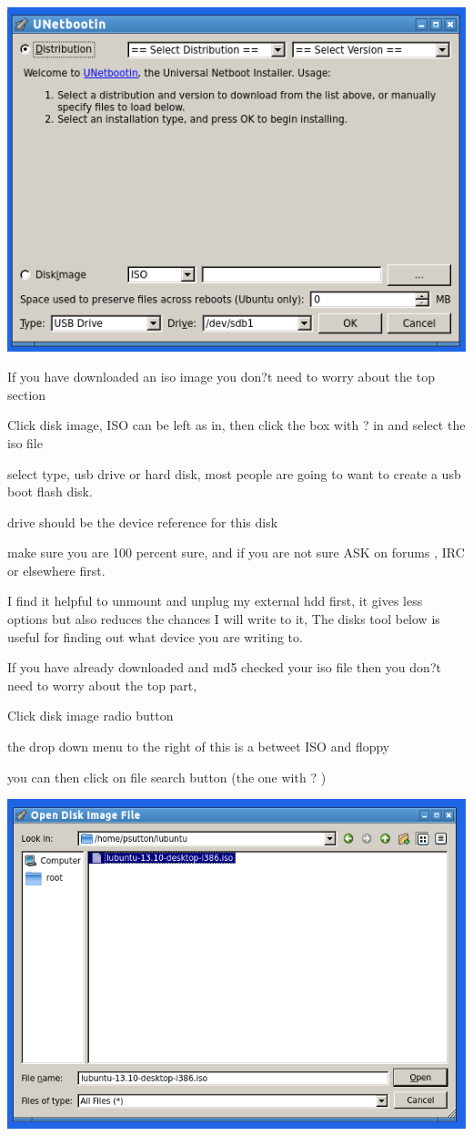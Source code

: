 \documentclass[12pt,a4paper]{book}
\begin{document}
\begin{center}
\includegraphics[width=0.7\linewidth]{unetbootin} 
\end{center}


If you have downloaded an iso image  you don?t need to worry about the top section

Click disk image,  ISO can be left as in,  then click the box with ? in and select the iso file

select type, usb drive or hard disk,  most people are going to want to create a usb boot flash disk.

drive should be the device reference for this disk

make sure you are 100 percent sure,  and if you are not sure ASK on forums , IRC or elsewhere first.

I find it helpful to unmount and unplug my external hdd first,  it gives less options but also reduces the chances I will write to it,  The disks tool below is useful for finding out what device you are writing to.

If you have already downloaded and md5 checked your iso file then you don?t need to worry about the top part,

Click disk image radio button

the drop down menu to the right of this is a betweet ISO and floppy

you can then click on file search button (the one with ? )
\begin{center}
\includegraphics[width=0.7\linewidth]{unetbootin2} 

\end{center}
\end{document}
